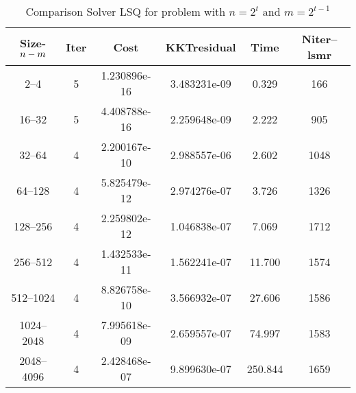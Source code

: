 \documentclass[letterpaper,12pt,oneside,final]{book}
\begin{document}
\begin{table}
\caption{Comparison Solver LSQ  for  problem with $n=2^{t}$ and $m=2^{t-1}$} 
\begin{center}
\begin{tabular}{|*{6}{c}|} \hline
Size-$n\--m$ & \multicolumn{1}{c}{Iter} & \multicolumn{1}{c}{Cost}& \multicolumn{1}{c}{KKTresidual} & \multicolumn{1}{c}{Time} & \multicolumn{1}{c|}{Niter--lsmr} \\ 
\hline

2--4 &      5    &       1.230896e-16&   3.483231e-09&   0.329&   166  \\       
16--32&      5    &       4.408788e-16&   2.259648e-09&   2.222&   905  \\       
32--64&      4    &       2.200167e-10&   2.988557e-06&   2.602&   1048 \\       
64--128&      4    &       5.825479e-12&   2.974276e-07&   3.726&   1326 \\       
128--256&      4    &       2.259802e-12&   1.046838e-07&   7.069&   1712 \\       
256--512&      4    &       1.432533e-11&   1.562241e-07&   11.700&   1574 \\       
512--1024&      4    &       8.826758e-10&   3.566932e-07&   27.606&   1586 \\       
1024--2048&      4    &       7.995618e-09&   2.659557e-07&   74.997&   1583 \\       
2048--4096&      4    &       2.428468e-07&   9.899630e-07&   250.844&   1659 \\  



\end{tabular}
\end{center}
\end{table}
\end{document}
